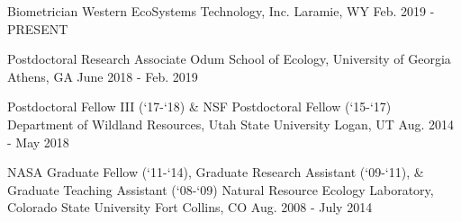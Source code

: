 

\begin{cventries}

  \eduentry
    {Biometrician} %
    {Western EcoSystems Technology, Inc.} %
    {Laramie, WY} %
    {Feb. 2019 - PRESENT} %

  \eduentry
    {Postdoctoral Research Associate} %
    {Odum School of Ecology, University of Georgia} %
    {Athens, GA} %
    {June 2018 - Feb. 2019} %

  \eduentry
    {Postdoctoral Fellow III (`17-`18) \& NSF Postdoctoral Fellow (`15-`17)} %
    {Department of Wildland Resources, Utah State University} %
    {Logan, UT} %
    {Aug. 2014 - May 2018} %

  \eduentry
    {NASA Graduate Fellow (`11-`14), Graduate Research Assistant (`09-`11), \& Graduate Teaching Assistant (`08-`09)} %
    {Natural Resource Ecology Laboratory, Colorado State University} %
    {Fort Collins, CO} %
    {Aug. 2008 - July 2014} %

\end{cventries}
